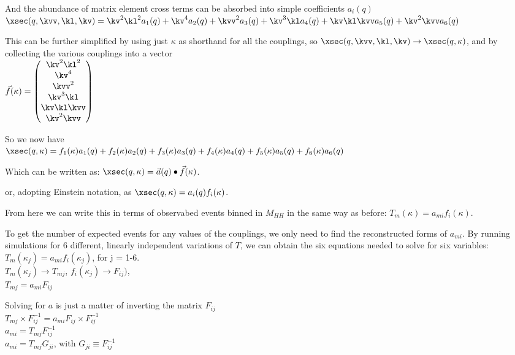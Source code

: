     And the abundance of matrix element cross terms can be absorbed into simple coefficients $a_i(q)$\\
    $\xsec(q,\kvv,\kl,\kv) = \kv^2 \kl^2 a_1(q) + \kv^4 a_2(q) + \kvv^2 a_3(q) + \kv^3 \kl a_4(q) + \kv \kl \kvv a_5(q) + \kv^2 \kvv a_6(q) $


    This can be further simplified by using just $\kappa$ as shorthand for all the couplings,
    so  $\xsec(q,\kvv,\kl,\kv) \to  \xsec(q,\kappa) $, and by collecting the various couplings into a vector\\
    $ \vec{f}(\kappa) = \begin{pmatrix} \kv^2 \kl^2 \\ \kv^4 \\ \kvv^2 \\ \kv^3 \kl \\ \kv \kl \kvv \\ \kv^2 \kvv \end{pmatrix} $

    So we now have\\
    $\xsec(q,\kappa) = f_1(\kappa) a_1(q) + f_2(\kappa) a_2(q) + f_3(\kappa) a_3(q) + f_4(\kappa) a_4(q) + f_5(\kappa) a_5(q) + f_6(\kappa) a_6(q) $

    Which can be written as:  
    $\xsec(q,\kappa) = \vec{a}(q) \bullet \vec{f}(\kappa) $.

    or, adopting Einstein notation, as
    $\xsec(q,\kappa) = a_i(q) f_i(\kappa) $.

    From here we can write this in terms of observabed events binned in $M_{HH}$ in the same way as before:
    $T_m(\kappa) = a_{mi} f_i(\kappa) $.

    To get the number of expected events for any values of the couplings, we only need to find the reconstructed forms of $a_{mi}$.
    By running simulations for 6 different, linearly independent variations of $T$, we can obtain the six equations needed to solve for six variables:\\
    $T_m(\kappa_j) = a_{mi} f_i(\kappa_j) $, for j = 1-6. \\
    $T_m(\kappa_j) \to  T_{mj} $, $f_i(\kappa_j) \to F_{ij}) $, \\
    $T_{mj} = a_{mi} F_{ij}$

    Solving for $a$ is just a matter of inverting the matrix $F_{ij}$ \\
    $T_{mj} \times F_{ij}^{-1}= a_{mi} F_{ij} \times F_{ij}^{-1}$ \\
    $a_{mi} = T_{mj} F_{ij}^{-1}$ \\
    $a_{mi} = T_{mj} G_{ji}$, with $G_{ji} \equiv F_{ij}^{-1}$ \\

